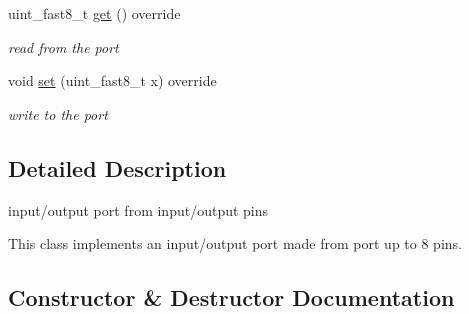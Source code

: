 \begin{DoxyCompactItemize}
uint\+\_\+fast8\+\_\+t \hyperlink{classhwlib_1_1port__in__out__from__pins_a5b8af7271d9fd08b005bc33ddada3cbe}{get} () override
\begin{DoxyCompactList}\small\item\em read from the port \end{DoxyCompactList}\item 
void \hyperlink{classhwlib_1_1port__in__out__from__pins_a6c2bbeca500638cb35f142e8f74bf857}{set} (uint\+\_\+fast8\+\_\+t x) override
\begin{DoxyCompactList}\small\item\em write to the port \end{DoxyCompactList}\end{DoxyCompactItemize}


\subsection{Detailed Description}
input/output port from input/output pins 

This class implements an input/output port made from port up to 8 pins. 

\subsection{Constructor \& Destructor Documentation}
